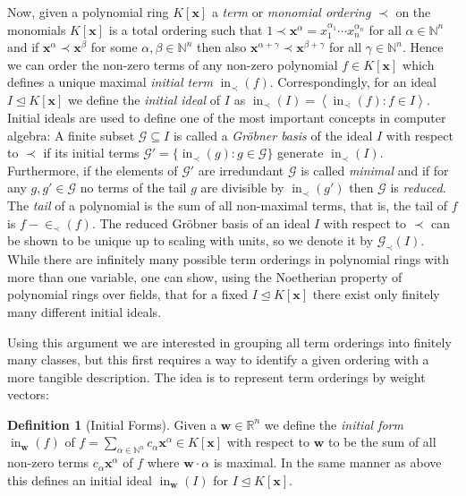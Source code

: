 \documentclass[
  paper=a4,
  titlepage,
  bibliography=totoc,
  listof=totoc,
  pagesize=pdftex
]{scrartcl}
\numberwithin{figure}{section}
\numberwithin{equation}{section}
\numberwithin{table}{section}
\newcommand*\setR{\mathds{R}}
\newcommand*\setN{\mathds{N}}
\newcommand*\ideal[1]{\left\langle #1 \right\rangle}
\let\vec\mathbf
\let\idealof\trianglelefteq
\DeclareMathOperator{\initial}{in}
\theoremstyle{definition}
\newtheorem{definition}{Definition}
\numberwithin{definition}{section}
\begin{document}
Now, given a polynomial ring $K[\vec x]$ a \emph{term} or \emph{monomial ordering} $\prec$
on the monomials $K[\vec x]$ is a total ordering such that $1 \prec \vec x^\alpha =
x_1^{\alpha_1}\cdots x_n^{\alpha_n}$ for all $\alpha \in \setN^n$ and if $\vec x^\alpha
\prec \vec x^\beta$ for some $\alpha, \beta \in \setN^n$ then also $\vec x^{\alpha+\gamma}
\prec \vec x^{\beta+\gamma}$ for all $\gamma \in \setN^n$. Hence we can order the non-zero
terms of any non-zero polynomial $f \in K[\vec x]$ which defines a unique maximal
\emph{initial term} $\initial_\prec(f)$. Correspondingly, for an ideal $I \idealof K[\vec
x]$ we define the \emph{initial ideal} of $I$ as $\initial_\prec(I) =
\ideal{\initial_\prec(f) : f \in I}$. Initial ideals are used to define one of the most
important concepts in computer algebra: A finite subset $\mathcal G \subseteq I$ is called
a \emph{Gröbner basis} of the ideal $I$ with respect to $\prec$ if its initial terms
$\mathcal G' = \{ \initial_\prec(g) : g \in \mathcal G \}$ generate $\initial_\prec(I)$.
Furthermore, if the elements of $\mathcal G'$ are irredundant $\mathcal G$ is called
\emph{minimal} and if for any $g, g' \in \mathcal G$ no terms of the tail $g$ are
divisible by $\initial_\prec(g')$ then $\mathcal G$ is \emph{reduced}. The \emph{tail} of
a polynomial is the sum of all non-maximal terms, that is, the tail of $f$ is
$f-\in_{\prec}(f)$. The reduced Gröbner basis of an ideal $I$ with respect to $\prec$ can
be shown to be unique up to scaling with units, so we denote it by $\mathcal G_\prec(I)$.
While there are infinitely many possible term orderings in polynomial rings with more than
one variable, one can show, using the Noetherian property of polynomial rings over fields,
that for a fixed $I \idealof K[\vec x]$ there exist only finitely many different initial
ideals.

Using this argument we are interested in grouping all term orderings into finitely many
classes, but this first requires a way to identify a given ordering with a more tangible
description. The idea is to represent term orderings by weight vectors:

\begin{definition}[Initial Forms]
  \label{def:initFormG}
  Given a $\vec w \in \setR^n$ we define the \emph{initial form} $\initial_{\vec w}(f)$ of
  $f = \sum_{\alpha\in\setN^n} c_\alpha \vec x^\alpha \in K[\vec x]$ with respect to $\vec
  w$ to be the sum of all non-zero terms $c_\alpha \vec x^\alpha$ of $f$ where $\vec
  w\cdot \alpha$ is maximal. In the same manner as above this defines an initial ideal
  $\initial_{\vec w}(I)$ for $I \idealof K[\vec x]$.
\end{definition}
\end{document}
